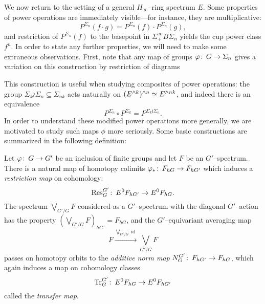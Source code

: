 We now return to the setting of a general \(H_\infty\)--ring spectrum \(E\).  Some properties of power operations are immediately visible---for instance, they are multiplicative: \[P^{\Sigma_n}(f \cdot g) = P^{\Sigma_n}(f) \cdot P^{\Sigma_n}(g),\] and restriction of \(P^{\Sigma_n}(f)\) to the basepoint in \(\Sigma^\infty_+ B\Sigma_n\) yields the cup power class \(f^n\).  In order to state any further properties, we will need to make some extraneous observations.  First, note that any map of groups \(\varphi\colon\thinspace G \to \Sigma_n\) gives a variation on this construction by restriction of diagrams
\begin{center}
\end{center}
This construction is useful when studying composites of power operations: the group \(\Sigma_k \wr \Sigma_n \subseteq \Sigma_{nk}\) acts naturally on \((E^{\wedge k})^{\wedge n} \simeq E^{\wedge nk}\), and indeed there is an equivalence \[P^{\Sigma_n} \circ P^{\Sigma_k} = P^{\Sigma_k \wr \Sigma_n}.\]  In order to understand these modified power operations more generally, we are motivated to study such maps \(\phi\) more seriously.  Some basic constructions are summarized in the following definition:
\begin{definition}\label{EquivariantDefns}
Let \(\varphi\colon\thinspace G \to G'\) be an inclusion of finite groups and let \(F\) be an \(G'\)--spectrum.  There is a natural map of homotopy colimits \(\varphi_*\colon\thinspace F_{hG} \to F_{hG'}\) which induces a \textit{restriction map} on cohomology: \[\mathrm{Res}_G^{G'}\colon\thinspace E^0 F_{hG'} \to E^0 F_{hG}.\]  The spectrum \(\bigvee_{G'/G} F\) considered as a \(G'\)--spectrum with the diagonal \(G'\)--action has the property \((\bigvee_{G'/G} F)_{hG'} = F_{hG}\), and the \(G'\)--equivariant averaging map \[F \xrightarrow{\bigvee_{G'/G} \operatorname{id}} \bigvee_{G'/G} F\] passes on homotopy orbits to the \textit{additive norm map} \(N_G^{G'}\colon\thinspace F_{hG'} \to F_{hG}\), which again induces a map on cohomology classes \[\mathrm{Tr}_G^{G'}\colon\thinspace E^0 F_{hG} \to E^0 F_{hG'}\] called the \textit{transfer map}.
\end{definition}

